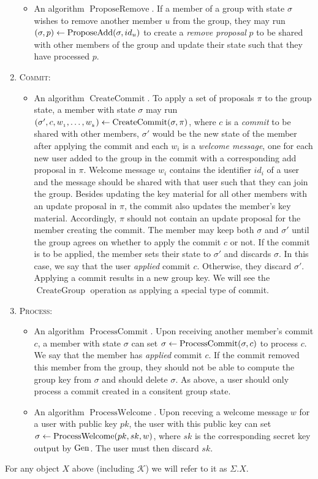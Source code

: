 \begin{definition}[CGKA]
\begin{enumerate}[1.]
\begin{itemize}
				\item An algorithm $\operatorname{ProposeRemove}$. If a member of a group with state $\sigma$ wishes to remove another member $u$ from the group, they may run $(\sigma, p) \leftarrow \operatorname{ProposeAdd}(\sigma, id_u)$ to create a \emph{remove proposal} $p$ to be shared with other members of the group and update their state such that they have processed $p$.
			\end{itemize}
		\item[] \textsc{Commit:}
			\begin{itemize}
				\item An algorithm $\operatorname{CreateCommit}$. To apply a set of proposals $\pi$ to the group state, a member with state $\sigma$ may run $(\sigma', c, w_{_1}, \ldots, w_{_k}) \leftarrow \operatorname{CreateCommit}(\sigma, \pi)$, where $c$ is a \emph{commit} to be shared with other members, $\sigma'$ would be the new state of the member after applying the commit and each $w_{i}$ is a \emph{welcome message}, one for each new user added to the group in the commit with a corresponding add proposal in $\pi$. Welcome message $w_i$ contains the identifier $id_i$ of a user and the message should be shared with that user such that they can join the group. Besides updating the key material for all other members with an update proposal in $\pi$, the commit also updates the member's key material. Accordingly, $\pi$ should not contain an update proposal for the member creating the commit. The member may keep both $\sigma$ and $\sigma'$ until the group agrees on whether to apply the commit $c$ or not. If the commit is to be applied, the member sets their state to $\sigma'$ and discards $\sigma$. In this case, we say that the user \emph{applied} commit $c$. Otherwise, they discard $\sigma'$. Applying a commit results in a new group key. We will see the $\operatorname{CreateGroup}$ operation as applying a special type of commit.
			\end{itemize}
		\item[] \textsc{Process:}
			\begin{itemize}
				\item An algorithm $\operatorname{ProcessCommit}$. Upon receiving another member's commit $c$, a member with state $\sigma$ can set $\sigma \leftarrow \operatorname{ProcessCommit}(\sigma, c)$ to process $c$. We say that the member has \emph{applied} commit $c$. If the commit removed this member from the group, they should not be able to compute the group key from $\sigma$ and should delete $\sigma$.
				      As above, a user should only process a commit created in a consitent group state.
				\item An algorithm $\operatorname{ProcessWelcome}$. Upon receving a welcome message $w$ for a user with public key $pk$, the user with this public key can set $\sigma \leftarrow \operatorname{ProcessWelcome}(pk, sk, w)$, where $sk$ is the corresponding secret key output by $\mathrm{Gen}$. The user must then discard $sk$.
			\end{itemize}
	\end{enumerate}
	For any object $X$ above (including $\mathcal{K}$) we will refer to it as $\Sigma.X$.


\end{definition}
